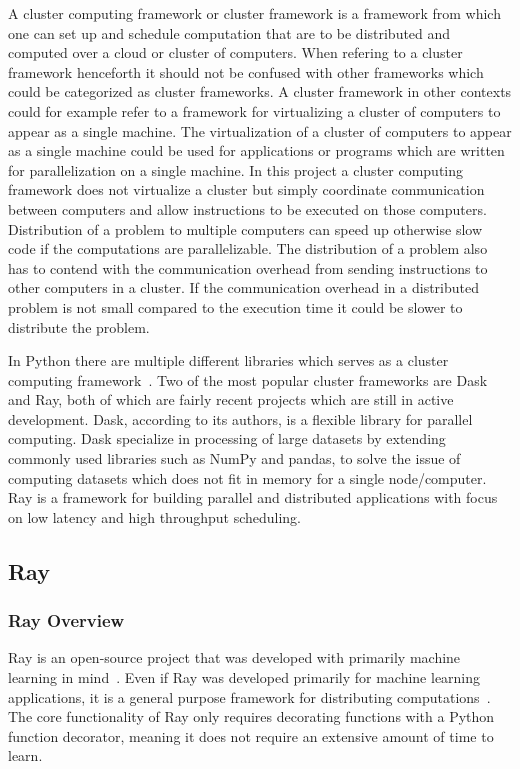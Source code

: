 \documentclass[12pt, a4paper]{article}
\begin{document}
A cluster computing framework or cluster framework is a framework from which one can set up and schedule computation that are to be distributed and computed over a cloud or cluster of computers.
When refering to a cluster framework henceforth it should not be confused with other frameworks which could be categorized as cluster frameworks.
A cluster framework in other contexts could for example  refer to a framework for virtualizing a cluster of computers to appear as a single machine.
The virtualization of a cluster of computers to appear as a single machine could be used for applications or programs which are written for parallelization on a single machine.
In this project a cluster computing framework does not virtualize a cluster but simply coordinate communication between computers and allow instructions to be executed on those computers.
Distribution of a problem to multiple computers can speed up otherwise slow code if the computations are parallelizable.
The distribution of a problem also has to contend with the communication overhead from sending instructions to other computers in a cluster.
If the communication overhead in a distributed problem is not small compared to the execution time it could be slower to distribute the problem.

In Python there are multiple different libraries which serves as a cluster computing framework~\cite{PythonClusterFrameworks}.
Two of the most popular cluster frameworks are Dask and Ray, both of which are fairly recent projects which are still in active development.
Dask, according to its authors, is a flexible library for parallel computing. 
Dask specialize in processing of large datasets by extending commonly used libraries such as NumPy and pandas, to solve the issue of computing datasets which does not fit in memory for a single node/computer.
Ray is a framework for building parallel and distributed applications with focus on low latency and high throughput scheduling.


\subsection{Ray}

\subsubsection{Ray Overview}

Ray is an open-source project that was developed with primarily machine learning in mind~\cite{nishihara2017realtime, moritz2018ray}. 
Even if Ray was developed primarily for machine learning applications, it is a general purpose framework for distributing computations~\cite{ray:whatIsRay}.
The core functionality of Ray only requires decorating functions with a Python function decorator, meaning it does not require an extensive amount of time to learn.
\end{document}
